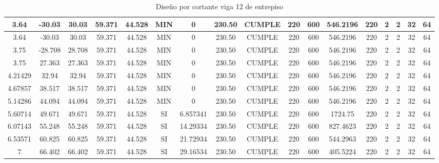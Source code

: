 \begin{table}[H]
{\begin{tabular}{|c|c|c|c|c|c|c|c|c|c|c|c|c|c|c|c|c|}
    \hline
    3.64  & -30.03 & 30.03 & 59.371 & 44.528 & MIN   & 0     & 230.50 & CUMPLE & 220   & 600   & 546.2196 & 220   & 2     & 2     & 32    & 64 \bigstrut\\
    \hline
    3.64  & -30.03 & 30.03 & 59.371 & 44.528 & MIN   & 0     & 230.50 & CUMPLE & 220   & 600   & 546.2196 & 220   & 2     & 2     & 32    & 64 \bigstrut\\
    \hline
    3.75  & -28.708 & 28.708 & 59.371 & 44.528 & MIN   & 0     & 230.50 & CUMPLE & 220   & 600   & 546.2196 & 220   & 2     & 2     & 32    & 64 \bigstrut\\
    \hline
    3.75  & 27.363 & 27.363 & 59.371 & 44.528 & MIN   & 0     & 230.50 & CUMPLE & 220   & 600   & 546.2196 & 220   & 2     & 2     & 32    & 64 \bigstrut\\
    \hline
    4.21429 & 32.94 & 32.94 & 59.371 & 44.528 & MIN   & 0     & 230.50 & CUMPLE & 220   & 600   & 546.2196 & 220   & 2     & 2     & 32    & 64 \bigstrut\\
    \hline
    4.67857 & 38.517 & 38.517 & 59.371 & 44.528 & MIN   & 0     & 230.50 & CUMPLE & 220   & 600   & 546.2196 & 220   & 2     & 2     & 32    & 64 \bigstrut\\
    \hline
    5.14286 & 44.094 & 44.094 & 59.371 & 44.528 & MIN   & 0     & 230.50 & CUMPLE & 220   & 600   & 546.2196 & 220   & 2     & 2     & 32    & 64 \bigstrut\\
    \hline
    5.60714 & 49.671 & 49.671 & 59.371 & 44.528 & SI    & 6.857341 & 230.50 & CUMPLE & 220   & 600   & 1724.75 & 220   & 2     & 2     & 32    & 64 \bigstrut\\
    \hline
    6.07143 & 55.248 & 55.248 & 59.371 & 44.528 & SI    & 14.29334 & 230.50 & CUMPLE & 220   & 600   & 827.4623 & 220   & 2     & 2     & 32    & 64 \bigstrut\\
    \hline
    6.53571 & 60.825 & 60.825 & 59.371 & 44.528 & SI    & 21.72934 & 230.50 & CUMPLE & 220   & 600   & 544.2963 & 220   & 2     & 2     & 32    & 64 \bigstrut\\
    \hline
    7     & 66.402 & 66.402 & 59.371 & 44.528 & SI    & 29.16534 & 230.50 & CUMPLE & 220   & 600   & 405.5224 & 220   & 2     & 2     & 32    & 64 \bigstrut\\
    \hline
    \end{tabular}}%
  \caption{Diseño por cortante viga 12 de entrepiso}
  \label{tab:Cort V12E}%
\end{table}%
